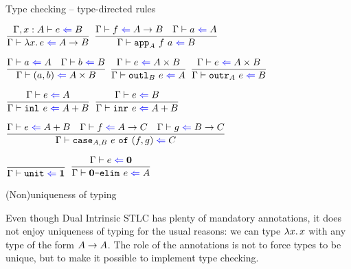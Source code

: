 \documentclass{beamer}
\begin{document}
\begin{frame}{Type checking -- type-directed rules}

\begin{center}
  $\infrule{\check[\extend{\Gamma}{x}{A}]{e}{B}}{\check{\fun{x}{e}}{\Fun{A}{B}}}$ \enspace
  $\infrule{\check{f}{\Fun{A}{B}} \quad \check{a}{A}}{\check{\app[A]{f}{a}}{B}}$

  \vspace{2em}

  $\infrule{\check{a}{A} \quad \check{b}{B}}{\check{\pair{a}{b}}{\Prod{A}{B}}}$ \enspace
  $\infrule{\check{e}{\Prod{A}{B}}}{\check{\outl[B]{e}}{A}}$ \enspace
  $\infrule{\check{e}{\Prod{A}{B}}}{\check{\outr[A]{e}}{B}}$

  \vspace{2em}

  $\infrule{\check{e}{A}}{\check{\inl{e}}{\Sum{A}{B}}}$ \quad
  $\infrule{\check{e}{B}}{\check{\inr{e}}{\Sum{A}{B}}}$

  \vspace{2em}

  $\infrule{\check{e}{\Sum{A}{B}} \quad \check{f}{\Fun{A}{C}} \quad \check{g}{\Fun{B}{C}}}{\check{\caseannot{A}{B}{e}{f}{g}}{C}}$

  \vspace{2em}

  $\infrule{}{\check{\unit}{\Unit}}$ \quad
  $\infrule{\check{e}{\Empty}}{\check{\emptyelim{e}}{A}}$
\end{center}

\end{frame}

\begin{frame}{(Non)uniqueness of typing}

Even though Dual Intrinsic STLC has plenty of mandatory annotations, it does not enjoy uniqueness of typing for the usual reasons: we can type $\fun{x}{x}$ with any type of the form $A \to A$. The role of the annotations is not to force types to be unique, but to make it possible to implement type checking.

\end{frame}
\end{document}
